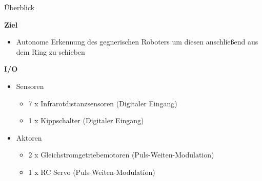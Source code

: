 \documentclass{beamer}
\begin{document}
\begin{frame}{\"Uberblick}
\begin{large}\textbf{Ziel}\end{large}
\begin{itemize}
	\item Autonome Erkennung des gegnerischen Roboters um diesen anschlie\ss{}end aus dem Ring zu schieben \href{./videos/sergeant-pain.mp4}{}
\end{itemize}
\vspace{20px}
\begin{large}\textbf{I/O}\end{large}
\begin{itemize}
	\item Sensoren
	\begin{itemize}
		\item 7 x Infrarotdistanzsensoren (Digitaler Eingang)
		\item 1 x Kippschalter (Digitaler Eingang)
	\end{itemize}
	\item Aktoren
	\begin{itemize}
		\item 2 x Gleichstromgetriebemotoren (Puls-Weiten-Modulation)
		\item 1 x RC Servo (Puls-Weiten-Modulation)
	\end{itemize}
\end{itemize}
\end{frame}
\end{document}
